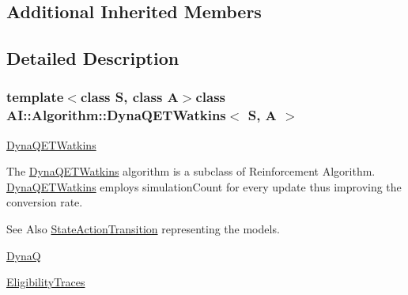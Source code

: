 \subsection*{Additional Inherited Members}


\subsection{Detailed Description}
\subsubsection*{template$<$class S, class A$>$class A\-I\-::\-Algorithm\-::\-Dyna\-Q\-E\-T\-Watkins$<$ S, A $>$}

\hyperlink{classAI_1_1Algorithm_1_1DynaQETWatkins}{Dyna\-Q\-E\-T\-Watkins} 

The \hyperlink{classAI_1_1Algorithm_1_1DynaQETWatkins}{Dyna\-Q\-E\-T\-Watkins} algorithm is a subclass of Reinforcement Algorithm. \hyperlink{classAI_1_1Algorithm_1_1DynaQETWatkins}{Dyna\-Q\-E\-T\-Watkins} employs simulation\-Count for every update thus improving the conversion rate.

\begin{DoxySeeAlso}{See Also}
\hyperlink{classAI_1_1Algorithm_1_1StateActionTransition}{State\-Action\-Transition} representing the models.

\hyperlink{classAI_1_1Algorithm_1_1DynaQ}{Dyna\-Q} 

\hyperlink{classAI_1_1Algorithm_1_1EligibilityTraces}{Eligibility\-Traces} 
\end{DoxySeeAlso}


